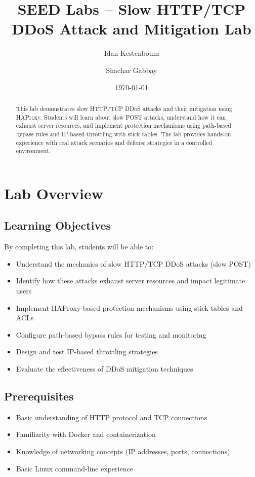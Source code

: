 \documentclass[12pt]{article}
\title{SEED Labs – Slow HTTP/TCP DDoS Attack and Mitigation Lab}
\author{Idan Kestenboum \and Shachar Gabbay}
\date{\today}
\begin{document}
\maketitle

\begin{abstract}
This lab demonstrates slow HTTP/TCP DDoS attacks and their mitigation using HAProxy. Students will learn about slow POST attacks, understand how it can exhaust server resources, and implement protection mechanisms using path-based bypass rules and IP-based throttling with stick tables. The lab provides hands-on experience with real attack scenarios and defense strategies in a controlled environment.
\end{abstract}

\tableofcontents
\newpage

\section{Lab Overview}

\subsection{Learning Objectives}
By completing this lab, students will be able to:
\begin{itemize}
    \item Understand the mechanics of slow HTTP/TCP DDoS attacks (slow POST)
    \item Identify how these attacks exhaust server resources and impact legitimate users
    \item Implement HAProxy-based protection mechanisms using stick tables and ACLs
    \item Configure path-based bypass rules for testing and monitoring
    \item Design and test IP-based throttling strategies
    \item Evaluate the effectiveness of DDoS mitigation techniques
\end{itemize}

\subsection{Prerequisites}
\begin{itemize}
    \item Basic understanding of HTTP protocol and TCP connections
    \item Familiarity with Docker and containerization
    \item Knowledge of networking concepts (IP addresses, ports, connections)
    \item Basic Linux command-line experience
\end{itemize}
\end{document}
